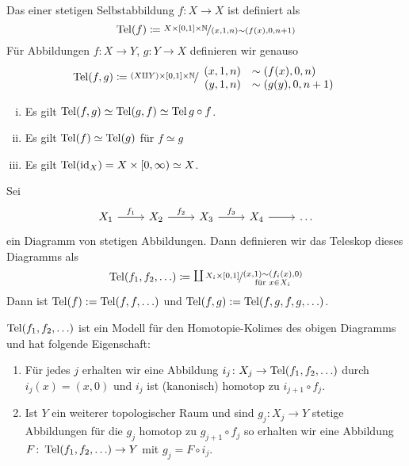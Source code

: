 \begin{definition}[{name=[{Abbildungsteleskop}]}]
	Das  einer stetigen Selbstabbildung $f \colon X \to X$ ist definiert als
	\[
		\Tel(f) \coloneqq \nicefrac{X \times [0,1] \times \mathbb{N}}{(x,1,n) \sim \enbrace*{f(x),0,n+1}}
	\]
	Für Abbildungen $f \colon X \to Y$, $g \colon Y \to X$ definieren wir genauso 
	\[
		\Tel(f,g) \coloneqq \nicefrac{(X \amalg Y) \times [0,1] \times \mathbb{N}}{
			\begin{array}{rl}
				(x,1,n) &\sim \enbrace*{f(x),0,n} \\
				(y,1,n) &\sim \enbrace*{g(y),0,n+1}
			\end{array}
		} 
	\]
\end{definition}

\begin{bemerkung}
	\begin{enumerate}[(i)]
		\item Es gilt $\Tel(f,g) \simeq \Tel(g,f) \simeq \Tel{g \circ f}$.
		\item Es gilt $\Tel(f) \simeq \Tel(g)$ für $f \simeq g$
		\item Es gilt $\Tel(\id_X) = X \times [0,\infty) \simeq X$.
	\end{enumerate}
\end{bemerkung}

\begin{definition}
	Sei
	\[
		\begin{tikzcd}
			X_1 \rar["f_1"] & X_2 \rar["f_2"] & X_3 \rar["f_3"] & X_4 \rar & \ldots 
		\end{tikzcd}
	\]
	ein Diagramm von stetigen Abbildungen.
	Dann definieren wir das Teleskop dieses Diagramms als 
	\[
		\Tel(f_1,f_2,\ldots ) \coloneqq \nicefrac{\coprod X_i \times [0,1]}{
			\substack{(x,1) \sim \enbrace*{f_i(x),0} \\ \text{für } x \in X_i }}
	\]
	Dann ist $\Tel(f) := \Tel(f,f,\ldots )$ und $\Tel(f,g) := \Tel(f,g,f,g, \ldots )$.
\end{definition}

\begin{bemerkung}
	$\Tel(f_1,f_2, \ldots )$ ist ein Modell für den Homotopie-Kolimes des obigen Diagramms und hat folgende Eigenschaft:
	\begin{enumerate}[1)]
		\item Für jedes $j$ erhalten wir eine Abbildung $i_j \colon X_j \to \Tel(f_1, f_2, \ldots)$ durch $i_j(x) = (x,0)$ und $i_j$ ist (kanonisch) homotop zu $i_{j+1} \circ f_j$.
		\item Ist $Y$ ein weiterer topologischer Raum und sind $g_j \colon X_j \to Y$ stetige Abbildungen für die $g_j$ homotop zu $g_{j+1} \circ f_j$ so erhalten wir eine Abbildung $F \colon \Tel(f_1,f_2,\ldots ) \to Y$ mit $g_j = F \circ i_j$.
	\end{enumerate}
\end{bemerkung}


